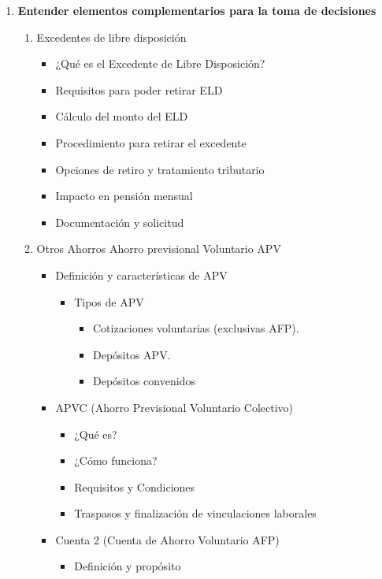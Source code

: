 \begin{enumerate}
\item \textbf{Entender elementos complementarios para la toma de decisiones}
\begin{enumerate}
    \item Excedentes de libre disposición
    \begin{itemize}
        \item ¿Qué es el Excedente de Libre Disposición?
        \item Requisitos para poder retirar ELD
        \item Cálculo del monto del ELD
        \item Procedimiento para retirar el excedente
        \item Opciones de retiro y tratamiento tributario
        \item Impacto en pensión mensual
        \item Documentación y solicitud
    \end{itemize}
    \item Otros Ahorros Ahorro previsional Voluntario APV
    \begin{itemize}
        \item Definición y características de APV
        \begin{itemize}
        \item Tipos de APV
        \begin{itemize}
            \item Cotizaciones voluntarias (exclusivas AFP).
            \item Depósitos APV.
            \item Depósitos convenidos 
        \end{itemize}
        \end{itemize}
        \item APVC (Ahorro Previsional Voluntario Colectivo)
        \begin{itemize}
            \item ¿Qué es?
            \item ¿Cómo funciona?
            \item Requisitos y Condiciones
            \item Traspasos y finalización de vinculaciones laborales
        \end{itemize}
        \item Cuenta 2 (Cuenta de Ahorro Voluntario AFP)
        \begin{itemize}
            \item Definición y propósito

\end{itemize}
\end{itemize}
\end{enumerate}
\end{enumerate}
